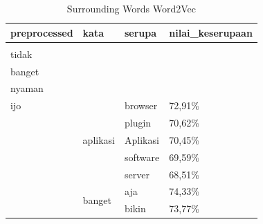 \begin{longtable}[c]{|l|l|l|l|}
  \caption{Surrounding Words Word2Vec}
  \label{tab:analysis_mostsimilar_word2vec}                                                                                                                                                              \\
  \hline
  preprocessed                                                                                                             & kata                         & serupa                   & nilai\_keserupaan \\ \hline
  \endhead
  \hline
  \endfoot
  \multirow[t]{20}{*}{\begin{tabular}[t]{@{}l@{}}aplikasi\\ tidak\\ banget\\ nyaman\\ ijo\end{tabular}}                    & \multirow[t]{5}{*}{aplikasi} & browser                  & 72,91\%           \\ \cline{3-4}
                                                                                                                           &                              & plugin                   & 70,62\%           \\ \cline{3-4}
                                                                                                                           &                              & Aplikasi                 & 70,45\%           \\ \cline{3-4}
                                                                                                                           &                              & software                 & 69,59\%           \\ \cline{3-4}
                                                                                                                           &                              & server                   & 68,51\%           \\ \cline{2-4}
                                                                                                                           & \multirow[t]{5}{*}{banget}   & aja                      & 74,33\%           \\ \cline{3-4}
                                                                                                                           &                              & bikin                    & 73,77\%           \\ \cline{3-4}

\end{longtable}
